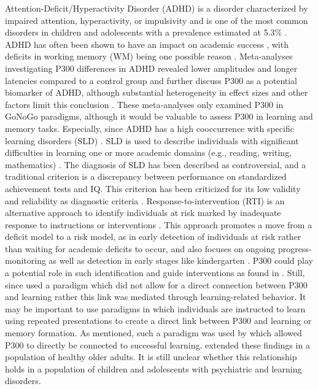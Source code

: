Attention-Deficit/Hyperactivity Disorder (ADHD) is a disorder characterized by impaired attention, hyperactivity, or impulsivity \parencite{swansonAttentiondeficitHyperactivityDisorder1998} and is one of the most common disorders in children and adolescents with a prevalence estimated at 5.3\% \parencite{polanczykEpidemiologyAttentiondeficitHyperactivity2007}. ADHD has often been shown to have an impact on academic success \parencite{frazierADHDAchievementMetaAnalysis2007}, with deficits in working memory (WM) being one possible reason \parencite{kimAdultADHDWorking2014, martinussenMetaanalysisWorkingMemory2005}. Meta-analyses investigating P300 differences in ADHD revealed lower amplitudes and longer latencies compared to a control group and further discuss P300 as a potential biomarker of ADHD, although substantial heterogeneity in effect sizes and other factors limit this conclusion \parencite{kaiserEarlierLaterCognitive2020,szuromiP300DeficitsAdults2011}. These meta-analyses only examined P300 in GoNoGo paradigms, although it would be valuable to assess P300 in learning and memory tasks. Especially, since ADHD has a high cooccurrence with specific learning disorders (SLD) \parencite{boadaUnderstandingComorbidityDyslexia2012}. SLD is used to describe individuals with significant difficulties in learning one or more academic domains (e.g., reading, writing, mathematics) \parencite{phamSpecificLearningDisorders2015}. The diagnosis of SLD has been described as controversial, and a traditional criterion is a discrepancy between performance on standardized achievement tests and IQ. This criterion has been criticized for its low validity and reliability as diagnostic criteria \parencite{fletcherEvidencebasedAssessmentLearning2005}. Response-to-intervention (RTI) is an alternative approach to identify individuals at risk marked by inadequate response to instructions or interventions \parencite{vaughnRedefiningLearningDisabilities2003}. This approach promotes a move from a deficit model to a risk model, as in early detection of individuals at risk rather than waiting for academic deficits to occur, and also focuses on ongoing progress-monitoring as well as detection in early stages like kindergarten \parencite{vaughnRedefiningLearningDisabilities2003}. P300 could play a potential role in such identification and guide interventions as found in \textcite{wieckiModelBasedCognitiveNeuroscience2015}. Still, since \textcite{wieckiModelBasedCognitiveNeuroscience2015} used a paradigm which did not allow for a direct connection between P300 and learning rather this link was mediated through learning-related behavior. It may be important to use paradigms in which individuals are instructed to learn using repeated presentations to create a direct link between P300 and learning or memory formation.  As mentioned, such a paradigm was used by \textcite{steinemannTrackingNeuralCorrelates2016} which allowed P300 to directly be connected to successful learning. \textcite{strzelczykNeurophysiologicalMarkersSuccessful2022} extended these findings in a population of healthy older adults. It is still unclear whether this relationship holds in a population of children and adolescents with psychiatric and learning disorders. 
